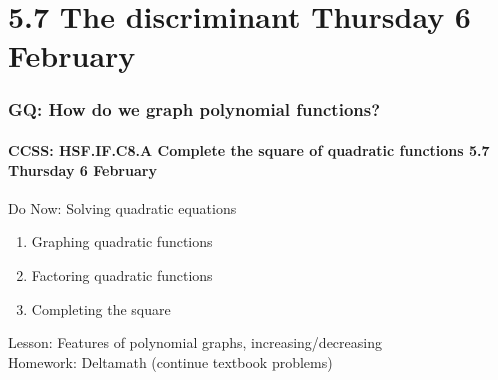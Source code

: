 \documentclass{beamer}
\begin{document}
\section{5.7 The discriminant \hfill Thursday 6 February}
\frame
{
  \frametitle{GQ: How do we graph polynomial functions?}
  \framesubtitle{CCSS: HSF.IF.C8.A Complete the square of quadratic functions \hfill \alert{5.7 Thursday 6 February}}

  \begin{block}{Do Now: Solving quadratic equations}
    \begin{enumerate}
      \item Graphing quadratic functions
      \item Factoring quadratic functions
      \item Completing the square
    \end{enumerate}
    \end{block}
    Lesson: Features of polynomial graphs, increasing/decreasing \\ \smallskip
    Homework: Deltamath (continue textbook problems)
    }
        
\end{document}

